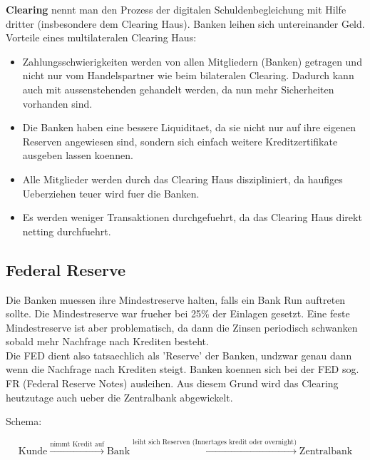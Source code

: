 \documentclass[a4paper]{article}
\begin{document}
\textbf{Clearing} nennt man den Prozess der digitalen Schuldenbegleichung
mit Hilfe dritter (insbesondere dem Clearing Haus).
Banken leihen sich untereinander Geld. \\

Vorteile eines multilateralen Clearing Haus:

\begin{itemize}
	\item Zahlungsschwierigkeiten werden von allen Mitgliedern (Banken) getragen
	      und nicht nur vom Handelspartner wie beim bilateralen Clearing. Dadurch
	      kann auch mit aussenstehenden gehandelt werden, da nun mehr Sicherheiten
	      vorhanden sind.

	\item Die Banken haben eine bessere Liquiditaet, da sie nicht nur auf ihre
	      eigenen Reserven angewiesen sind, sondern sich einfach weitere
	      Kreditzertifikate ausgeben lassen koennen.

	\item Alle Mitglieder werden durch das Clearing Haus diszipliniert, da
	      haufiges Ueberziehen teuer wird fuer die Banken.

	\item Es werden weniger Transaktionen durchgefuehrt, da das Clearing Haus
	      direkt netting durchfuehrt.
\end{itemize}

\subsection{Federal Reserve}

Die Banken muessen ihre Mindestreserve halten, falls ein Bank Run auftreten
sollte. Die Mindestreserve war frueher bei 25\% der Einlagen gesetzt. Eine
feste Mindestreserve ist aber problematisch, da dann die Zinsen periodisch
schwanken sobald mehr Nachfrage nach Krediten besteht. \\

Die FED dient also tatsaechlich als 'Reserve' der Banken, undzwar genau dann
wenn die Nachfrage nach Krediten steigt. Banken koennen sich bei der FED sog.
FR (Federal Reserve Notes) ausleihen. Aus diesem Grund wird das Clearing
heutzutage auch ueber die Zentralbank abgewickelt.

Schema:

\[
	\text{Kunde}
	\overset{\text{nimmt Kredit auf}} \longrightarrow
	\text{Bank}
	\overset{\text{leiht sich Reserven (Innertages kredit oder overnight)}}
	\longrightarrow
	\text{Zentralbank}
\]
\end{document}

